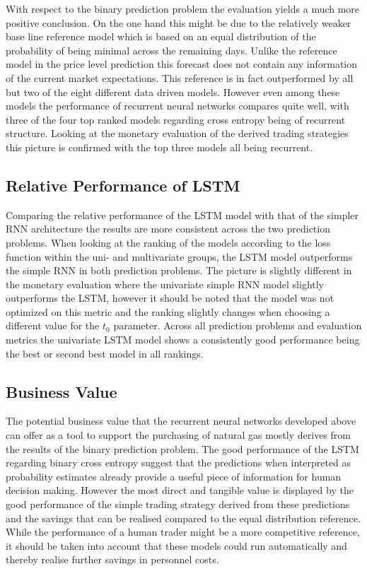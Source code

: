 With respect to the binary prediction problem the evaluation yields a much more positive conclusion. On the one hand this might be due to the relatively weaker base line reference model which is based on an equal distribution of the probability of being minimal across the remaining days. Unlike the reference model in the price level prediction this forecast does not contain any information of the current market expectations. This reference is in fact outperformed by all but two of the eight different data driven models. However even among these models the performance of recurrent neural networks compares quite well, with three of the four top ranked models regarding cross entropy being of recurrent structure. 
Looking at the monetary evaluation of the derived trading strategies this picture is confirmed with the top three models all being recurrent.
\subsection{Relative Performance of LSTM}
Comparing the relative performance of the LSTM model with that of the simpler RNN architecture the results are more consistent across the two prediction problems. When looking at the ranking of the models according to the loss function within the uni- and multivariate groups, the LSTM model outperforms the simple RNN in both prediction problems. The picture is slightly different in the monetary evaluation where the univariate simple RNN model slightly outperforms the LSTM, however it should be noted that the model was not optimized on this metric and the ranking slightly changes when choosing a different value for the $t_0$ parameter. Across all prediction problems and evaluation metrics the univariate LSTM model shows a consistently good performance being the best or second best model in all rankings. 
\subsection{Business Value}
The potential business value that the recurrent neural networks developed above can offer as a tool to support the purchasing of natural gas mostly derives from the results of the binary prediction problem. The good performance of the LSTM regarding binary cross entropy suggest that the predictions when interpreted as probability estimates already provide a useful piece of information for human decision making. However the most direct and tangible value is displayed by the good performance of the simple trading strategy derived from these predictions and the savings that can be realised compared to the equal distribution reference. While the performance of a human trader might be a more competitive reference, it should be taken into account that these models could run automatically and thereby realise further savings in personnel costs.
